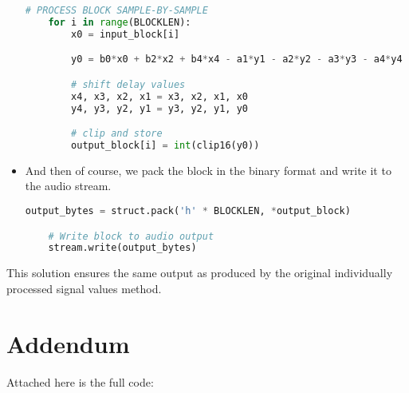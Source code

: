 \documentclass[11pt]{article}
\begin{document}
\begin{itemize}
\begin{lstlisting}[language=python, label={lst:code}, breaklines=true, ]
    # PROCESS BLOCK SAMPLE-BY-SAMPLE 
    for i in range(BLOCKLEN):
        x0 = input_block[i]

        y0 = b0*x0 + b2*x2 + b4*x4 - a1*y1 - a2*y2 - a3*y3 - a4*y4

        # shift delay values
        x4, x3, x2, x1 = x3, x2, x1, x0
        y4, y3, y2, y1 = y3, y2, y1, y0

        # clip and store
        output_block[i] = int(clip16(y0))
    \end{lstlisting}  

    \item And then of course, we pack the block in the binary format and write it to the audio stream.

    \begin{lstlisting}[language=python, label={lst:code}, breaklines=true, ]
    output_bytes = struct.pack('h' * BLOCKLEN, *output_block)

    # Write block to audio output
    stream.write(output_bytes)
    \end{lstlisting}  
\end{itemize}

This solution ensures the same output as produced by the original individually processed signal values method. 

\pagebreak
\section*{Addendum}
Attached here is the full code:
\end{document}
